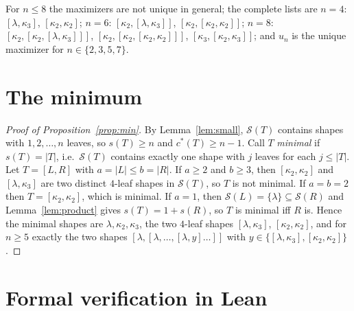 \documentclass[11pt]{amsart}
\theoremstyle{definition}
\theoremstyle{remark}
\newcommand{\lf}{\lambda}
\newcommand{\Sh}{\mathcal{S}}
\newcommand{\cstar}{c^{*}}
\begin{document}
For $n\le 8$ the maximizers are not unique in general; the complete lists are
$n=4$: $[\lf,\kappa_3]$, $[\kappa_2,\kappa_2]$;
$n=6$: $[\kappa_2,[\lf,\kappa_3]]$, $[\kappa_2,[\kappa_2,\kappa_2]]$;
$n=8$: $[\kappa_2,[\kappa_2,[\lf,\kappa_3]]]$, $[\kappa_2,[\kappa_2,[\kappa_2,\kappa_2]]]$, $[\kappa_3,[\kappa_2,\kappa_3]]$;
and $u_n$ is the unique maximizer for $n\in\{2,3,5,7\}$.

\section{The minimum}\label{sec:min}

\begin{proof}[Proof of Proposition~\ref{prop:min}]
By Lemma~\ref{lem:small}, $\Sh(T)$ contains shapes with $1,2,\dots,n$ leaves, so $s(T)\ge n$ and $\cstar(T)\ge n-1$.
Call $T$ \emph{minimal} if $s(T)=|T|$, i.e.\ $\Sh(T)$ contains exactly one shape with $j$ leaves for each $j\le|T|$.
Let $T=[L,R]$ with $a=|L|\le b=|R|$.
If $a\ge 2$ and $b\ge 3$, then $[\kappa_2,\kappa_2]$ and $[\lf,\kappa_3]$ are two distinct $4$-leaf shapes in $\Sh(T)$, so $T$ is not minimal.
If $a=b=2$ then $T=[\kappa_2,\kappa_2]$, which is minimal.
If $a=1$, then $\Sh(L)=\{\lf\}\subseteq\Sh(R)$ and Lemma~\ref{lem:product} gives $s(T)=1+s(R)$, so $T$ is minimal iff $R$ is.
Hence the minimal shapes are $\lf,\kappa_2,\kappa_3$, the two $4$-leaf shapes $[\lf,\kappa_3]$, $[\kappa_2,\kappa_2]$, and for $n\ge 5$ exactly the two shapes $[\lf,[\lf,\dots,[\lf,y]\dots]]$ with $y\in\{[\lf,\kappa_3],[\kappa_2,\kappa_2]\}$.
\end{proof}

\section{Formal verification in Lean}\label{sec:lean}
\end{document}
